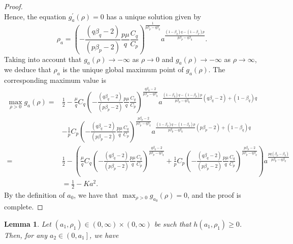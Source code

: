 \documentclass[11pt]{amsart}
\newtheorem{lemma}[theorem]{Lemma}
\numberwithin{equation}{section}
\begin{document}
{{\begin{proof}
\begin{equation}
    \end{equation}
    Hence, the equation $g_a^{\prime}(\rho)=0$ has a unique solution given by
    \begin{equation}\label{eq-rho0}
    \rho_a= \left(-\frac{\left(q \beta_q-2\right)}{\left(p \beta_p-2\right)}
     \frac{p \mu}{q}
     \frac{C_q}{C_p}\right)
     ^{\frac{1}{p \beta_p-q \beta_q}}
     a^{\frac{\left(1-\beta_q\right) q-\left(1-\beta_p\right)p}{p \beta_p-q \beta_q}}.
    \end{equation}
    Taking into account that $g_a(\rho) \rightarrow-\infty$ as $\rho \rightarrow 0$ and $g_a(\rho) \rightarrow-\infty$ as $\rho \rightarrow \infty$, we deduce that $\rho_a$ is the unique global maximum point of $g_a(\rho)$. The corresponding maximum value is
    \begin{equation}
    \begin{aligned}
    \max _{\rho>0} g_a(\rho)  =&
    \frac{1}{2}-
    \frac{\mu}{q}C_q
    \left(-\frac{\left(q \beta_q-2\right)}{\left(p \beta_p-2\right)}
    \frac{p \mu}{q}
    \frac{C_q}{C_p}\right)
    ^{\frac{q\beta_q-2}{p \beta_p-q \beta_q}}
    a^{{\frac{\left(1-\beta_q\right) q-\left(1-\beta_p\right)p}{p \beta_p-q \beta_q}}
    ({q\beta_q-2})+{(1-\beta_q) q}}\\
    &-\frac{1}{p}C_p
    \left(-\frac{\left(q \beta_q-2\right)}{\left(p \beta_p-2\right)}
    \frac{p \mu}{q}
    \frac{C_q}{C_p}\right)
    ^{\frac{p\beta_p-2}{p \beta_p-q \beta_q}}
    a^{{\frac{\left(1-\beta_q\right) q-\left(1-\beta_p\right)p}{p \beta_p-q \beta_q}}
        ({p\beta_p-2})+{(1-\beta_q) q}}\\
    =&\frac{1}{2}-
    \left(\frac{\mu}{q}C_q
    \left(-\frac{\left(q \beta_q-2\right)}{\left(p \beta_p-2\right)}
    \frac{p \mu}{q}
    \frac{C_q}{C_p}\right)
    ^{\frac{q\beta_q-2}{p \beta_p-q \beta_q}}
    +
    \frac{1}{p}C_p
    \left(-\frac{\left(q \beta_q-2\right)}{\left(p \beta_p-2\right)}
    \frac{p \mu}{q}
    \frac{C_q}{C_p}\right)
    ^{\frac{p\beta_p-2}{p \beta_p-q \beta_q}}
    \right)
    a^{\frac{pq(\beta_p-\beta_q)}{p\beta_p-q\beta_q}}\\
    &=\frac{1}{2}-Ka^2.
    \end{aligned}
    \end{equation}
    By the definition of $a_0$, we have that $\max _{\rho>0} g_{a_0}(\rho)=0$, and the proof is complete.
    \end{proof}
    \begin{lemma}\label{lem5-f}
    Let $\left(a_1, \rho_1\right) \in(0, \infty) \times(0, \infty)$ be such that $h\left(a_1, \rho_1\right) \geq 0$. Then, for any $a_2 \in\left(0, a_1\right]$, we have

\end{lemma}}}
\end{document}
